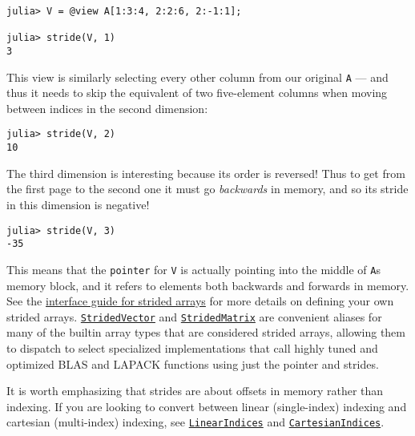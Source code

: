 \begin{verbatim}
julia> V = @view A[1:3:4, 2:2:6, 2:-1:1];

julia> stride(V, 1)
3
\end{verbatim}



This view is similarly selecting every other column from our original \texttt{A} — and thus it needs to skip the equivalent of two five-element columns when moving between indices in the second dimension:




\begin{verbatim}
julia> stride(V, 2)
10
\end{verbatim}



The third dimension is interesting because its order is reversed! Thus to get from the first {\textquotedbl}page{\textquotedbl} to the second one it must go \emph{backwards} in memory, and so its stride in this dimension is negative!




\begin{verbatim}
julia> stride(V, 3)
-35
\end{verbatim}



This means that the \texttt{pointer} for \texttt{V} is actually pointing into the middle of \texttt{A}{\textquotesingle}s memory block, and it refers to elements both backwards and forwards in memory. See the \hyperlink{3010450308855105276}{interface guide for strided arrays} for more details on defining your own strided arrays. \hyperlink{18350706206094827862}{\texttt{StridedVector}} and \hyperlink{3855703768476610836}{\texttt{StridedMatrix}} are convenient aliases for many of the builtin array types that are considered strided arrays, allowing them to dispatch to select specialized implementations that call highly tuned and optimized BLAS and LAPACK functions using just the pointer and strides.



It is worth emphasizing that strides are about offsets in memory rather than indexing. If you are looking to convert between linear (single-index) indexing and cartesian (multi-index) indexing, see \hyperlink{12250457823889413092}{\texttt{LinearIndices}} and \hyperlink{16831958174907250244}{\texttt{CartesianIndices}}.



\hypertarget{16922701023279192482}{}


